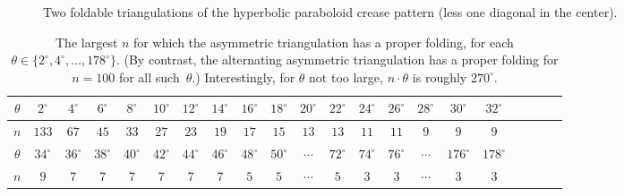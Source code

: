 \documentclass[11pt,letterpaper]{article}
\begin{document}
\begin{figure}
  \centering
  \hfil
  \caption{Two foldable triangulations of the hyperbolic paraboloid
           crease pattern (less one diagonal in the center).}
  \label{hypar triangulations}
\end{figure}

\begin{table}
  \centering
  \begin{tabular}{c|cccccccccccccccccccc}
    $\theta$ & $2^\circ$ & $4^\circ$ & $6^\circ$ & $8^\circ$ & $10^\circ$ & $12^\circ$ & $14^\circ$ & $16^\circ$ & $18^\circ$ & $20^\circ$ & $22^\circ$ & $24^\circ$ & $26^\circ$ & $28^\circ$ & $30^\circ$ & $32^\circ$
    \\ \hline
    $n$ & $133$ & $67$ & $45$ & $33$ & $27$ & $23$ & $19$ & $17$ & $15$ & $13$ & $13$ & $11$ & $11$ & $9$ & $9$ & $9$
    \bigskip \\
    $\theta$ & $34^\circ$ & $36^\circ$ & $38^\circ$ & $40^\circ$ & $42^\circ$ & $44^\circ$ & $46^\circ$ & $48^\circ$ & $50^\circ$ & $\cdots$ & $72^\circ$ & $74^\circ$ & $76^\circ$ & $\cdots$ & $176^\circ$ & $178^\circ$
    \\ \hline
    $n$ & $9$ & $7$ & $7$ & $7$ & $7$ & $7$ & $7$ & $5$ & $5$ & $\cdots$ & $5$ & $3$ & $3$ & $\cdots$ & $3$ & $3$
  \end{tabular}
  \caption{The largest $n$ for which the asymmetric triangulation has a proper
    folding, for each $\theta \in \{2^\circ, 4^\circ, \dots, 178^\circ\}$.
    (By contrast, the alternating asymmetric triangulation
     has a proper folding for $n=100$ for all such~$\theta$.)
    Interestingly, for $\theta$ not too large,
    $n \cdot \theta$ is roughly $270^\circ$.}
  \label{n vs theta}
\end{table}
\end{document}

